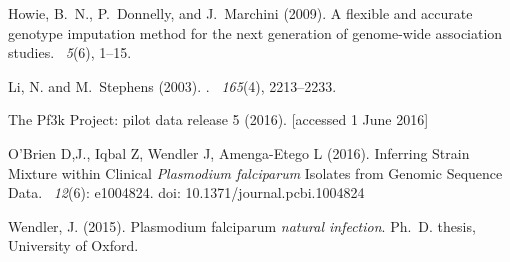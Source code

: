 \documentclass{bioinfo}
\begin{document}
\begin{thebibliography}{}
Howie, B.~N., P.~Donnelly, and J.~Marchini (2009).
\newblock A flexible and accurate genotype imputation method for the next
  generation of genome-wide association studies.
~{\em 5\/}(6), 1--15.

Li, N. and M.~Stephens (2003).
.
~{\em 165\/}(4), 2213--2233.

The Pf3k Project: pilot data release 5 (2016).
 [accessed 1 June 2016]

O'Brien D,J., Iqbal Z, Wendler J, Amenga-Etego L (2016). \newblock Inferring Strain Mixture within Clinical {\em Plasmodium falciparum} Isolates from Genomic Sequence Data. ~{\em 12\/}(6): e1004824. doi: 10.1371/journal.pcbi.1004824


Wendler, J. (2015).
 {P}lasmodium falciparum {\em natural infection}.
\newblock Ph.\ D. thesis, University of Oxford.


\end{thebibliography}
\end{document}

